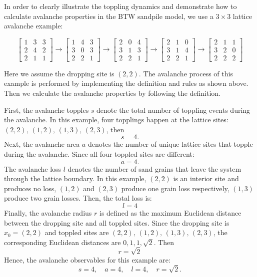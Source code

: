 In order to clearly illustrate the toppling dynamics and demonstrate how to calculate avalanche properties in the BTW sandpile model, we use a $3\times3$ lattice avalanche example:  

$$
\begin{bmatrix}
1 & 3 & 3\\
2 & 4 & 2\\
2 & 1 & 1
\end{bmatrix}
\rightarrow
\begin{bmatrix}
1 & 4 & 3\\
3 & 0 & 3\\
2 & 2 & 1
\end{bmatrix}
\rightarrow
\begin{bmatrix}
2 & 0 & 4\\
3 & 1 & 3\\
2 & 2 & 1
\end{bmatrix}
\rightarrow
\begin{bmatrix}
2 & 1 & 0\\
3 & 1 & 4\\
2 & 2 & 1
\end{bmatrix}
\rightarrow
\begin{bmatrix}
2 & 1 & 1\\
3 & 2 & 0\\
2 & 2 & 2
\end{bmatrix}
$$

Here we assume the dropping site is $(2, 2)$. The avalanche process of this example is performed by implementing the definition and rules as shown above. Then we calculate the avalanche properties by following the definition. 

First, the avalanche topples $s$ denote the total number of toppling events during the avalanche. In this example, four topplings happen at the lattice sites: $(2,2),\, (1,2),\, (1,3),\, (2,3)$, then 
$$
s=4. 
$$
Next, the avalanche area $a$ denotes the number of unique lattice sites that topple during the avalanche. Since all four toppled sites are different:
$$
a=4. 
$$
The avalanche loss $l$ denotes the number of sand grains that leave the system through the lattice boundary. In this example, $(2,2)$ is an interior site and produces no loss, $(1,2)$ and $(2,3)$ produce one grain loss respectively, $(1,3)$ produce two grain losses. Then, the total loss is:
$$
l=4
$$
Finally, the avalanche radius $r$ is defined as the maximum Euclidean distance between the dropping site and all toppled sites. Since the dropping site is $x_0=(2,2)$ and toppled sites are $(2,2),\, (1,2),\, (1,3),\, (2,3)$, the corresponding Euclidean distances are $0, 1, 1, \sqrt2$. Then 
$$
r=\sqrt2
$$
Hence, the avalanche observables for this example are:
$$
s=4,\quad a=4,\quad l=4,\quad r=\sqrt2. 
$$



